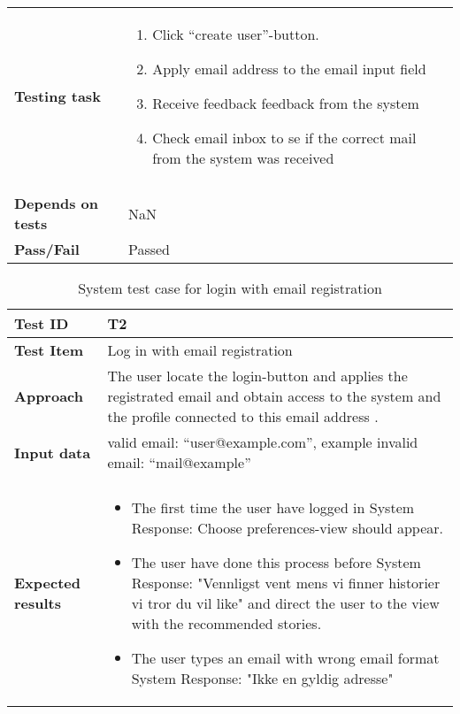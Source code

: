 \begin{appendices}
\begin{table}[H]
\begin{tabular}[b]{ | l | l  |}
			\textbf{Testing task} & \begin{minipage}{5in}
			\begin{enumerate}[noitemsep]
			\item Click  “create user”-button.
			\item Apply email address to the email input field 
			\item Receive feedback feedback from the system
			\item Check email inbox to se if the correct mail from the system was received 
			 \end{enumerate} \end{minipage}
			\\&\\[-3.8ex] \hline
			\textbf{Depends on tests}& NaN \\ \hline	
			\textbf{Pass/Fail} & Passed \\\hline				
		\end{tabular}
	\label{Tab:systemTesting1}
\end{table}


	\begin{table}[H]
		\centering
		\caption{System test case for login with email registration}
		\begin{tabular}{ | l | l  |}
			\hline
			\textbf{Test ID} & T2  \\ \hline 
			\textbf{Test Item} & Log in with email registration \\ \hline
			\textbf{Approach} & \begin{minipage}{5in}The user locate the login-button and applies the registrated email and obtain access to the system and the profile connected to this email address . \end{minipage}\\ \hline
			\textbf{Input data} &  valid email: “user@example.com”, \newline example invalid email: “mail@example”\\ \hline&\\[-3.8ex]
			\textbf{Expected results} & \begin{minipage}{5in}
			\begin{itemize}[noitemsep]
				\item The first time the user have logged in \newline System Response:  Choose preferences-view should appear.
				\item The user have done this process before \newline System Response: "Vennligst vent mens vi finner historier vi tror du vil like" and direct the user to the view with the recommended stories.
				\item The user types an email with wrong email format \newline System Response: "Ikke en gyldig adresse" 
				

\end{itemize}
\end{minipage}
\end{tabular}
\end{table}
\end{appendices}
